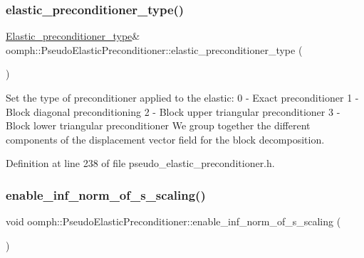 \subsubsection{\texorpdfstring{elastic\+\_\+preconditioner\+\_\+type()}{elastic\_preconditioner\_type()}}
{\footnotesize\ttfamily \hyperlink{classoomph_1_1PseudoElasticPreconditioner_acde733e1a111a961d1e714add4e8015d}{Elastic\+\_\+preconditioner\+\_\+type}\& oomph\+::\+Pseudo\+Elastic\+Preconditioner\+::elastic\+\_\+preconditioner\+\_\+type (\begin{DoxyParamCaption}{ }\end{DoxyParamCaption})\hspace{0.3cm}{\ttfamily [inline]}}



Set the type of preconditioner applied to the elastic\+: 0 -\/ Exact preconditioner 1 -\/ Block diagonal preconditioning 2 -\/ Block upper triangular preconditioner 3 -\/ Block lower triangular preconditioner We group together the different components of the displacement vector field for the block decomposition. 



Definition at line 238 of file pseudo\+\_\+elastic\+\_\+preconditioner.\+h.

\mbox{\label{classoomph_1_1PseudoElasticPreconditioner_a917caf20e03fc8bdb45336206ce5365e}} 
\subsubsection{\texorpdfstring{enable\+\_\+inf\+\_\+norm\+\_\+of\+\_\+s\+\_\+scaling()}{enable\_inf\_norm\_of\_s\_scaling()}}
{\footnotesize\ttfamily void oomph\+::\+Pseudo\+Elastic\+Preconditioner\+::enable\+\_\+inf\+\_\+norm\+\_\+of\+\_\+s\+\_\+scaling (\begin{DoxyParamCaption}{ }\end{DoxyParamCaption})\hspace{0.3cm}{\ttfamily [inline]}}




